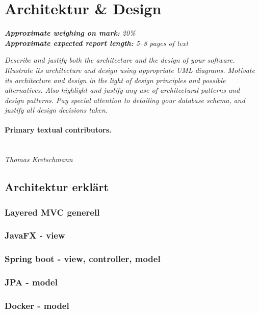 \section{Architektur \& Design}
\label{sec:architecture_design}

\emph{\textbf{Approximate weighing on mark:} 20\%}							\\
\emph{\textbf{Approximate expected report length:} 5--8 pages of text}

\emph{Describe and justify both the architecture and the design of your software. Illustrate its architecture and design using appropriate UML diagrams. Motivate its architecture and design in the light of design principles and possible alternatives. Also highlight and justify any use of architectural patterns and design patterns. Pay special attention to detailing your database schema, and justify all design decisions taken.}

\paragraph{Primary textual contributors.}
\mbox{}\\\emph{Thomas Kretschmann}

\subsection{Architektur erklärt }

\subsubsection{Layered MVC generell}

\subsubsection{JavaFX - view}

\subsubsection{Spring boot - view, controller, model}

\subsubsection{JPA - model}

\subsubsection{Docker - model}

